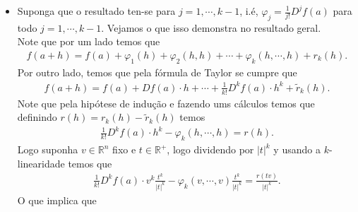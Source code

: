 \begin{homeworkProblem}[Seção 3-8]
\begin{solution}
\begin{itemize}
\begin{align*}
        \end{align*}
        Logo, restando, pegando $r(h)=r_1(h)-\tilde{r}_1(h)$ y fazendo ums cálculos temos que
        \begin{align*}
          Df(a)\cdot h-\varphi_1(h)=r(h).
        \end{align*}
        Logo suponha $v\in\mathbb{R}^{n}$ fixo e $t\in\mathbb{R}^{+}$, logo dividendo por $|t|$ y usando a linearidade temos que 
        \begin{align*}
          Df(a)\cdot \frac{tv}{|t|}-\varphi_1(v)\frac{t}{|t|}=\frac{r(tv)}{|t|}.
        \end{align*}
        O que implica que
        \begin{align*}
          Df(a)\cdot v - \varphi_{1}(v)=\lim_{t \to 0}\frac{r(tv)}{|tv|}|v|=0.
        \end{align*}
        Logo se pode conclui que $Df(a)\cdot v=\varphi_1(v)$ para todo $v\in\mathbb{R}^{n}$, i.é, $Df(a)=\varphi_{1}$.
      \item Suponga que o resultado ten-se para $j=1,\cdots,k-1$, i.é, $\varphi_j=\frac{1}{j!}D^{j}f(a)$ para todo $j=1,\cdots,k-1$. Vejamos o que isso demonstra no resultado geral.\\
        Note que por um lado temos que
        \begin{align*}
          f(a+h)=f(a)+\varphi_{1}(h)+\varphi_2(h,h)+\cdots+\varphi_{k}(h,\cdots,h)+r_{k}(h).
        \end{align*}
        Por outro lado, temos que pela fórmula de Taylor se cumpre que
        \begin{align*}
          f(a+h)=f(a)+Df(a)\cdot h+\cdots+\frac{1}{k!}D^{k}f(a)\cdot h^{k}+\tilde{r}_{k}(h).
        \end{align*}
        Note que pela hipótese de indução e fazendo ums cálculos temos que definindo $r(h)=r_k(h)-\tilde{r}_{k}(h)$ temos 
        \begin{align*}
          \frac{1}{k!}D^{k}f(a)\cdot h^{k}-\varphi_{k}(h,\cdots,h)=r(h). 
        \end{align*}
        Logo suponha $v\in\mathbb{R}^{n}$ fixo e $t\in\mathbb{R}^{+}$, logo dividendo por $|t|^{k}$ y usando a $k$-linearidade temos que
        \begin{align*}
          \frac{1}{k!}D^{k}f(a)\cdot v^{k} \frac{t^{k}}{|t|^{k}}-\varphi_k(v,\cdots,v)\frac{t^{k}}{|t|^{k}}=\frac{r(tv)}{|t|^{k}}.
        \end{align*}
        O que implica que
        \begin{align*}

\end{align*}
\end{itemize}
\end{solution}
\end{homeworkProblem}
